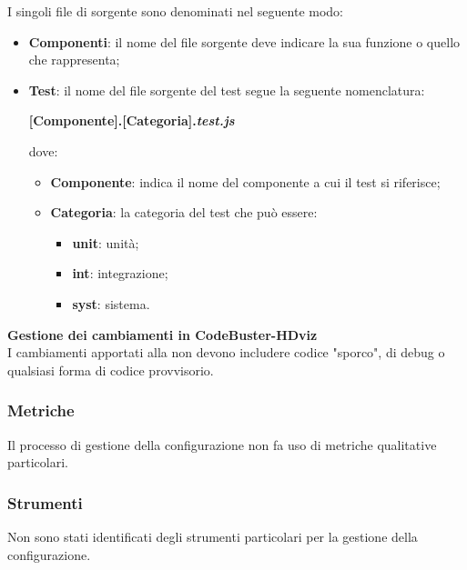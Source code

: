 I singoli file di sorgente sono denominati nel seguente modo:
\begin{itemize}
	\item \textbf{Componenti}: il nome del file sorgente deve indicare la sua funzione o quello che rappresenta;
	\item \textbf{Test}: il nome del file sorgente del test segue la seguente nomenclatura:
	\begin{center}
		\textbf{[Componente].[Categoria].\textit{test.js}}
	\end{center}
	
	dove:
	\begin{itemize}
		\item \textbf{Componente}: indica il nome del componente a cui il test si riferisce;
		
		\item \textbf{Categoria}: la categoria del test che può essere:
		\begin{itemize}
			\item \textbf{unit}: unità;
			
			\item \textbf{int}: integrazione;
			
			\item \textbf{syst}: sistema.
		\end{itemize}
	\end{itemize}
\end{itemize}

\mbox{}

\textbf{Gestione dei cambiamenti in CodeBuster-HDviz}\\
I cambiamenti apportati alla  non devono includere codice "sporco", di debug o qualsiasi forma di codice provvisorio.

\subsubsection{Metriche}
Il processo di gestione della configurazione non fa uso di metriche qualitative particolari.

\subsubsection{Strumenti}
Non sono stati identificati degli strumenti particolari per la gestione della configurazione.